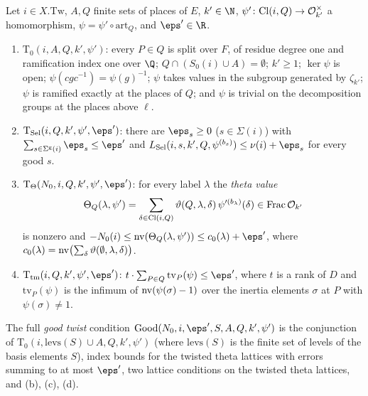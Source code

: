 \begin{definition}\label{pf:baselat1:def:goodtw}
Let $i\in X.\mathrm{Tw}$, $A,Q$ finite sets of places of $E$, $k'\in\N$, $\psi'\colon\mathrm{Cl}(i,Q)\to
\mathcal O_{k'}^\times$ a homomorphism, $\psi=\psi'\circ\mathrm{art}_Q$, and $\eps'\in\R$.
\begin{enumerate}[label=(\alph*)]
\item $\mathrm{T}_0(i,A,Q,k',\psi')$: every $P\in Q$ is split over $F$, of residue degree one and ramification
  index one over $\Q$; $Q\cap(S_0(i)\cup A)=\emptyset$; $k'\ge1$; $\ker\psi$ is open; $\psi(c g c^{-1})=\psi(g)^{-1}$;
  $\psi$ takes values in the subgroup generated by $\zeta_{k'}$; $\psi$ is ramified exactly at the places of $Q$;
  and $\psi$ is trivial on the decomposition groups at the places above $\ell$.
\item $\mathrm{T}_{\mathrm{Sel}}(i,Q,k',\psi',\eps')$: there are $\eps_s\ge0$ ($s\in\Sigma(i)$) with
  $\sum_{s\in\Sigma^{\mathrm g}(i)}\eps_s\le\eps'$ and $L_{\mathrm{Sel}}(i,s,k',Q,\psi^{(b_s)})\le\nu(i)+\eps_s$ for every
  good $s$.
\item $\mathrm{T}_{\Theta}(N_0,i,Q,k',\psi',\eps')$: for every label $\lambda$ the \emph{theta value}
  \[\Theta_Q(\lambda,\psi')=\sum_{\delta\in\mathrm{Cl}(i,Q)}\vartheta(Q,\lambda,\delta)\,\psi'^{(b_\lambda)}(\delta)
  \in\operatorname{Frac}\mathcal O_{k'}\]
  is nonzero and
  $-N_0(i)\le\baselatonenv(\Theta_Q(\lambda,\psi'))\le c_0(\lambda)+\eps'$, where
  $c_0(\lambda)=\operatorname{nv}\bigl(\sum_\delta\vartheta(\emptyset,\lambda,\delta)\bigr)$.
\item $\mathrm{T}_{\mathrm{tm}}(i,Q,k',\psi',\eps')$: $t\cdot\sum_{P\in Q}\mathrm{tv}_P(\psi)\le\eps'$, where $t$ is a rank of
  $D$ and $\mathrm{tv}_P(\psi)$ is the infimum of $\operatorname{nv}(\psi(\sigma)-1)$ over the inertia elements
  $\sigma$ at $P$ with $\psi(\sigma)\ne1$.
\end{enumerate}
\end{definition}

The full \emph{good twist} condition $\mathrm{Good}(N_0,i,\eps',S,A,Q,k',\psi')$ is the conjunction of
$\mathrm{T}_0(i,\mathrm{levs}(S)\cup A,Q,k',\psi')$ (where $\mathrm{levs}(S)$ is the finite set of levels of
the basis elements $S$), index bounds for the twisted theta lattices with errors summing to at most $\eps'$,
two lattice conditions on the twisted theta lattices, and (b), (c), (d).

